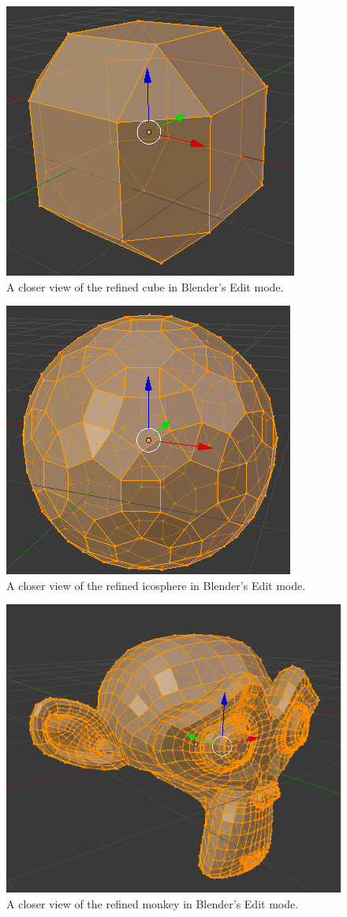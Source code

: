 \documentclass[11pt]{article}
\begin{document}
	\pagebreak
		\begin{figure}[h]
			\centering
			\captionsetup{justification=centering}
			\includegraphics[width=.3\linewidth]{img/refine_cube_2}
			\caption{A closer view of the refined cube in Blender's Edit mode.}
		\end{figure}	
		\begin{figure}[h]
			\centering
			\captionsetup{justification=centering}
			\includegraphics[width=.3\linewidth]{img/refine_icosphere_2}
			\caption{A closer view of the refined icosphere in Blender's Edit mode.}		
		\end{figure}
		\begin{figure}[bp!]
			\centering
			\captionsetup{justification=centering}
			\includegraphics[width=.4\linewidth]{img/refine_monkey_2}
			\caption{A closer view of the refined monkey in Blender's Edit mode.}			
		\end{figure}
	
	\pagebreak 
	
\end{document}
